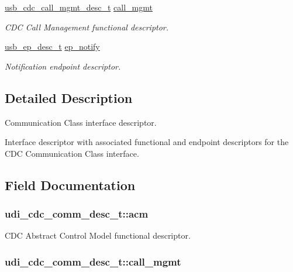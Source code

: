 \begin{DoxyCompactItemize}
\hyperlink{structusb__cdc__call__mgmt__desc__t}{usb\-\_\-cdc\-\_\-call\-\_\-mgmt\-\_\-desc\-\_\-t} \hyperlink{structudi__cdc__comm__desc__t_afb9b650303cb414e51b404788fa2eb4e}{call\-\_\-mgmt}
\begin{DoxyCompactList}\small\item\em \-C\-D\-C \-Call \-Management functional descriptor. \end{DoxyCompactList}\item 
\hyperlink{structusb__ep__desc__t}{usb\-\_\-ep\-\_\-desc\-\_\-t} \hyperlink{structudi__cdc__comm__desc__t_ae4f839a855f80e1942ae1de4cd5562d3}{ep\-\_\-notify}
\begin{DoxyCompactList}\small\item\em \-Notification endpoint descriptor. \end{DoxyCompactList}\end{DoxyCompactItemize}


\subsection{\-Detailed \-Description}
\-Communication \-Class interface descriptor. 

\-Interface descriptor with associated functional and endpoint descriptors for the \-C\-D\-C \-Communication \-Class interface. 

\subsection{\-Field \-Documentation}
\hypertarget{structudi__cdc__comm__desc__t_a6643c3fe52c61dc7cb0cc38a9f324d86}{
\subsubsection[{acm}]{ {\bf udi\-\_\-cdc\-\_\-comm\-\_\-desc\-\_\-t\-::acm}}}
\label{structudi__cdc__comm__desc__t_a6643c3fe52c61dc7cb0cc38a9f324d86}


\-C\-D\-C \-Abstract \-Control \-Model functional descriptor. 

\hypertarget{structudi__cdc__comm__desc__t_afb9b650303cb414e51b404788fa2eb4e}{
\subsubsection[{call\-\_\-mgmt}]{ {\bf udi\-\_\-cdc\-\_\-comm\-\_\-desc\-\_\-t\-::call\-\_\-mgmt}}}
\label{structudi__cdc__comm__desc__t_afb9b650303cb414e51b404788fa2eb4e}



